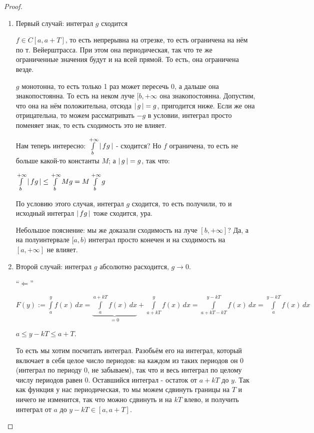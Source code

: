 \begin{proof}\slashns

    \begin{enumerate}
        \item Первый случай: интеграл $g$ сходится 

            $f \in C[a, a+T]$, то есть непрерывна на отрезке, то есть ограничена на нём по т. Вейерштрасса. При этом она периодическая, так что те же ограниченные значения будут и на всей прямой. То есть, она ограничена везде.

            $g$ монотонна, то есть только 1 раз может пересечь 0, а дальше она знакопостоянна. То есть на неком луче $[b, +\infty$ она знакопостоянна. Допустим, что она на нём положительна, отсюда $\left|\,{g}\,\right| = g$, пригодится ниже. Если же она отрицательна, то можем рассматривать $-g$ в условии, интеграл просто поменяет знак, то есть сходимость это не влияет.

            Нам теперь интересно: $\int\limits_b^{+\infty} \left|\,{fg}\,\right|$ - сходится? Но $f$ ограничена, то есть не больше какой-то константы $M$; а $\left|\,{g}\,\right| = g$, так что:

            $\int\limits_b^{+\infty} \left|\,{fg}\,\right| \le \int\limits_b^{+\infty} Mg = M\int\limits_b^{+\infty} g$

            По условию этого случая, интеграл $g$ сходится, то есть получили, то и исходный интеграл $\left|\,{fg}\,\right|$ тоже сходится, ура.

            Небольшое пояснение: мы же доказали сходимость на луче $[b, +\infty]$? Да, а на полуинтервале $[a, b)$ интеграл просто конечен и на сходимость на $[a, +\infty]$ не влияет.

        \item Второй случай: интеграл $g$ абсолютно расходится, $g \to 0$. 

	``$\Longleftarrow$''
	
    $F(y) := \int\limits_a^y f(x) \, dx = \underbrace{\int\limits_{a}^{a+kT} f(x) \, dx}_{= 0} + \int\limits_{a+kT}^y f(x) \, dx = \int\limits_{a+kT-kT}^{y-kT} f(x) \, dx = \int\limits_{a}^{y-kT} f(x) \, dx$
	
	$a \le y - kT \le a+ T$.

    То есть мы хотим посчитать интеграл. Разобьём его на интеграл, который включает в себя целое число периодов: на каждом из таких периодов он 0 (интеграл по периоду 0, не забываем), так что и весь интеграл по целому числу периодов равен 0. Оставшийся интеграл - остаток от $a+kT$ до $y$. Так как функция у нас периодическая, то мы можем сдвинуть границы на $T$ и ничего не изменится, так что можно сдвинуть и на $kT$ влево, и получить интеграл от $a$ до $y-kT \in [a, a+T]$.  
	

\end{enumerate}
\end{proof}
